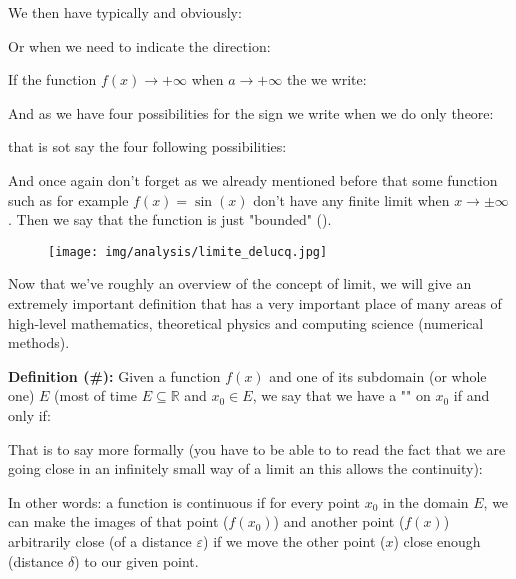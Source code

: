 	We then have typically and obviously:
	
	Or when we need to indicate the direction:
	
	If the function $f(x) \rightarrow +\infty$ when $a \rightarrow +\infty$ the we write:
	
	And as we have four possibilities for the sign we write when we do only theore:
	
	that is sot say the four following possibilities:
	
	And once again don't forget as we already mentioned before that some function such as for example $f(x)=\sin(x)$ don't have any finite limit when $x\rightarrow \pm \infty$. Then we say that the function is just "bounded" ().
	\begin{figure}[H]
		\centering
		\texttt{[image: img/analysis/limite\_delucq.jpg]}
	\end{figure}
	Now that we've roughly an overview of the concept of limit, we will give an extremely important definition that has a very important place of many areas of high-level mathematics, theoretical physics and computing science (numerical methods).
	
	\textbf{Definition (\#\mydef):} Given a function $f(x)$ and one of its subdomain (or whole one) $E$ (most of time $E \subseteq \mathbb{R}$ and $x_0\in E$, we say that we have a "" on $x_0$ if and only if:
	
	That is to say more formally (you have to be able to to read the fact that we are going close in an infinitely small way of a limit an this allows the continuity):
	
	In other words: a function is continuous if for every point $x_0$ in the domain $E$, we can make the images of that point ($f(x_0)$) and another point ($f(x)$) arbitrarily close (of a distance $\varepsilon$) if we move the other point ($x$) close enough (distance $\delta$) to our given point.
	
